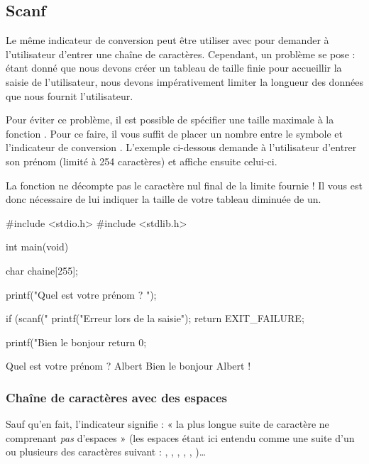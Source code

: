 \subsection{Scanf}
\label{scanf-2}

Le même indicateur de conversion peut être utiliser avec
 pour demander à l'utilisateur d'entrer une chaîne de
caractères. Cependant, un problème se pose : étant donné que nous devons
créer un tableau de taille finie pour accueillir la saisie de
l'utilisateur, nous devons impérativement limiter la longueur des
données que nous fournit l'utilisateur.

Pour éviter ce problème, il est possible de spécifier une taille
maximale à la fonction . Pour ce faire, il vous suffit
de placer un nombre entre le symbole \mybox{\%} et l'indicateur de
conversion . L'exemple ci-dessous demande à l'utilisateur
d'entrer son prénom (limité à 254 caractères) et affiche ensuite
celui-ci.

\begin{erreurbox}
La fonction  ne décompte
pas le caractère nul final de la limite fournie ! Il vous est donc
nécessaire de lui indiquer la taille de votre tableau diminuée de un.
\end{erreurbox}


\begin{C}
#include <stdio.h>
#include <stdlib.h>


int main(void)
{
    char chaine[255];

    printf("Quel est votre prénom ? ");

    if (scanf("%
    {
        printf("Erreur lors de la saisie\n");
        return EXIT_FAILURE;
    }

    printf("Bien le bonjour %
    return 0;
}
\end{C}

\begin{C}
Quel est votre prénom ? Albert
Bien le bonjour Albert !
\end{C}

\subsubsection{Chaîne de caractères avec des espaces}
\label{chaine-de-caracteres-avec-des-espaces}

Sauf qu'en fait, l'indicateur  signifie : « la plus longue
suite de caractère ne comprenant \emph{pas} d'espaces » (les espaces
étant ici entendu comme une suite d'un ou plusieurs des caractères
suivant : \mybox{\textquotesingle{}\ \textquotesingle{}},
,
,
,
,
)\ldots{}

